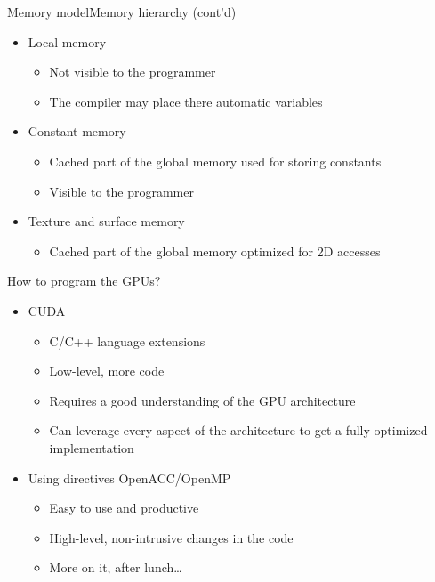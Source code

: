 \documentclass[aspectratio=169,12pt]{beamer}
\begin{document}
\begin{frame}{Memory model}{Memory hierarchy (cont'd)}
  \begin{itemize}
  \item Local memory
    \begin{itemize}
    \item Not visible to the programmer
    \item The compiler may place there automatic variables
    \end{itemize}
  \item Constant memory
    \begin{itemize}
    \item Cached part of the global memory used for storing constants
    \item Visible to the programmer
    \end{itemize}
  \item Texture and surface memory
    \begin{itemize}
    \item Cached part of the global memory optimized for 2D accesses
    \end{itemize}
  \end{itemize}
\end{frame}

\begin{frame}{How to program the GPUs?}
  \begin{itemize}
  \item CUDA
    \begin{itemize}
    \item C/C++ language extensions
    \item Low-level, more code
    \item Requires a good understanding of the GPU architecture
    \item Can leverage every aspect of the architecture to get a fully optimized implementation
    \end{itemize}
    \vspace\baselineskip
  \item Using directives OpenACC/OpenMP
    \begin{itemize}
    \item Easy to use and productive
    \item High-level, non-intrusive changes in the code
    \item More on it, after lunch\dots
    \end{itemize}
  \end{itemize}
\end{frame}


\end{document}

